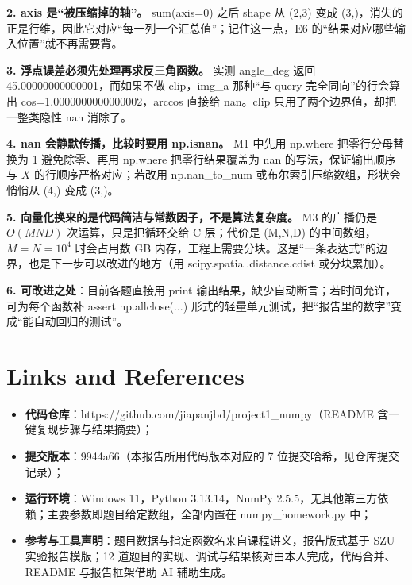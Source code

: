 \documentclass[a4paper,12pt]{article}
\newcommand{\code}[1]{{\ttfamily\footnotesize #1}}
\begin{document}
\textbf{2. axis 是“被压缩掉的轴”。} \code{sum(axis=0)} 之后 shape 从 \code{(2,3)} 变成 \code{(3,)}，消失的正是行维，因此它对应“每一列一个汇总值”；记住这一点，E6 的“结果对应哪些输入位置”就不再需要背。

\textbf{3. 浮点误差必须先处理再求反三角函数。} 实测 \code{angle\_deg} 返回 \code{45.00000000000001}，而如果不做 \code{clip}，\code{img\_a} 那种“与 query 完全同向”的行会算出 \code{cos=1.0000000000000002}，\code{arccos} 直接给 \code{nan}。\code{clip} 只用了两个边界值，却把一整类隐性 \code{nan} 消除了。

\textbf{4. \code{nan} 会静默传播，比较时要用 \code{np.isnan}。} M1 中先用 \code{np.where} 把零行分母替换为 1 避免除零、再用 \code{np.where} 把零行结果覆盖为 \code{nan} 的写法，保证输出顺序与 $X$ 的行顺序严格对应；若改用 \code{np.nan\_to\_num} 或布尔索引压缩数组，形状会悄悄从 \code{(4,)} 变成 \code{(3,)}。

\textbf{5. 向量化换来的是代码简洁与常数因子，不是算法复杂度。} M3 的广播仍是 $O(MND)$ 次运算，只是把循环交给 C 层；代价是 \code{(M,N,D)} 的中间数组，$M=N=10^4$ 时会占用数 GB 内存，工程上需要分块。这是“一条表达式”的边界，也是下一步可以改进的地方（用 \code{scipy.spatial.distance.cdist} 或分块累加）。

\textbf{6. 可改进之处}：目前各题直接用 \code{print} 输出结果，缺少自动断言；若时间允许，可为每个函数补 \code{assert np.allclose(...)} 形式的轻量单元测试，把“报告里的数字”变成“能自动回归的测试”。

\section{Links and References}

\begin{itemize}
    \item \textbf{代码仓库}：\code{https://github.com/jiapanjbd/project1\_numpy}（README 含一键复现步骤与结果摘要）；
    \item \textbf{提交版本}：\code{9944a66}（本报告所用代码版本对应的 7 位提交哈希，见仓库提交记录）；
    \item \textbf{运行环境}：Windows 11，Python 3.13.14，NumPy 2.5.5，无其他第三方依赖；主要参数即题目给定数组，全部内置在 \code{numpy\_homework.py} 中；
    \item \textbf{参考与工具声明}：题目数据与指定函数名来自课程讲义，报告版式基于 SZU 实验报告模版；12 道题目的实现、调试与结果核对由本人完成，代码合并、README 与报告框架借助 AI 辅助生成。
\end{itemize}
\end{document}
